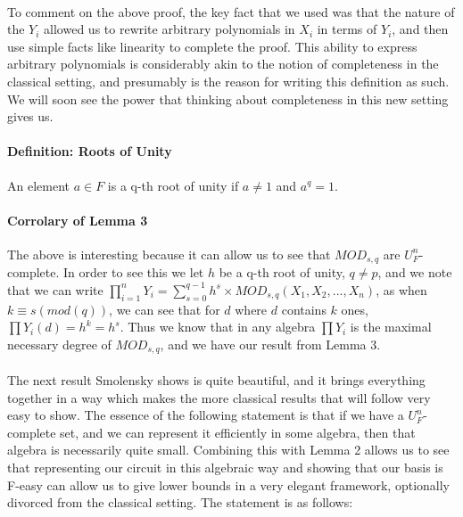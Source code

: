 \documentclass{article}
\begin{document}
\paragraph*{}
  To comment on the above proof, the key fact that we used was that the nature of the $Y_i$
allowed us to rewrite arbitrary polynomials in $X_i$ in terms of $Y_i$, and then use simple
facts like linearity to complete the proof. This ability to express arbitrary polynomials is
considerably akin to the notion of completeness in the classical setting, and presumably is
the reason for writing this definition as such. We will soon see the power that thinking about
completeness in this new setting gives us.

\paragraph*{Definition: Roots of Unity}
  An element $a \in F$ is a q-th root of unity if $a \neq 1$ and $a^q = 1$.

\paragraph*{Corrolary of Lemma 3 \cite{Smolensky1987}}
  The above is interesting because it can allow us to see that $MOD_{s, q}$ are $U_F^n$-complete. In 
order to see this we let $h$ be a q-th root of unity, $q \neq p$, and we note that we can
write $\prod_{i = 1}^n Y_i = \sum_{s = 0}^{q - 1} h^s \times MOD_{s, q}(X_1, X_2, ..., X_n)$,
as when $k \equiv s (mod(q))$, we can see that for $d$ where $d$ contains $k$ ones,
$\prod Y_i(d) = h^k = h^s$. Thus we know that in any algebra $\prod Y_i$ is the maximal necessary
degree of $MOD_{s, q}$, and we have our result from Lemma 3.

\paragraph*{}
  The next result Smolensky shows is quite beautiful, and it brings everything together in a way
which makes the more classical results that will follow very easy to show. The essence of the
following statement is that if we have a $U_F^n$-complete set, and we can represent it efficiently
in some algebra, then that algebra is necessarily quite small. Combining this with Lemma 2 allows
us to see that representing our circuit in this algebraic way and showing that our basis is F-easy
can allow us to give lower bounds in a very elegant framework, optionally divorced from the classical
setting. The statement is as follows:
\end{document}
